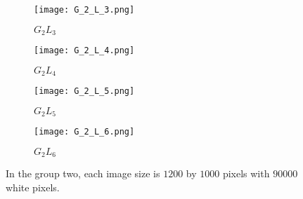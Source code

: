     \begin{figure}

     \centering
        
        \begin{subfigure}[b]{0.45\textwidth}
          \texttt{[image: G\_2\_L\_3.png]}
          \caption{$G_2L_3$}
          \label{fig:G2L3}
        \end{subfigure}
        \hfill
        \begin{subfigure}[b]{0.45\textwidth}
          \texttt{[image: G\_2\_L\_4.png]}
          \caption{$G_2L_4$}
          \label{fig:G2L4}
        \end{subfigure}

        \begin{subfigure}[b]{0.45\textwidth}
          \texttt{[image: G\_2\_L\_5.png]}
          \caption{$G_2L_5$}
          \label{fig:G2L5}
        \end{subfigure}
        \hfill
        \begin{subfigure}[b]{0.45\textwidth}
          \texttt{[image: G\_2\_L\_6.png]}
          \caption{$G_2L_6$}
          \label{fig:G2L6}
        \end{subfigure}

        \caption{In the group two, each image size is $1200$ by $1000$ pixels with
          $90000$ white pixels.}
        \label{fig:G2_imgs}

   \end{figure}
